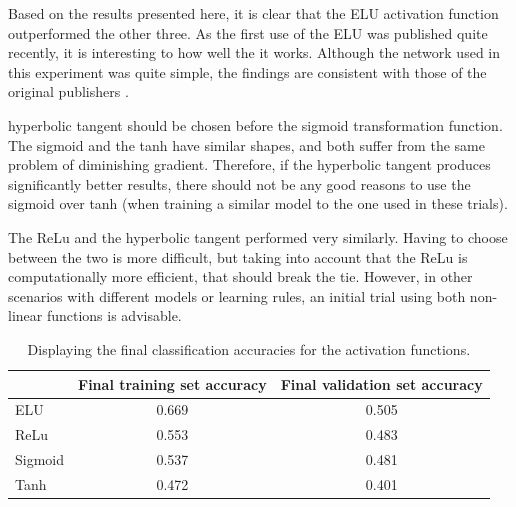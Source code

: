 \documentclass[]{article}
\begin{document}
Based on the results presented here, it is clear that the ELU activation function outperformed the other three. As the first use of the ELU was published quite recently, it is interesting to how well the it works. Although the network used in this experiment was quite simple, the findings are consistent with those of the original publishers \cite{elu}. 

 hyperbolic tangent should be chosen before the sigmoid transformation function. The sigmoid and the tanh have similar shapes, and both suffer from the same problem of diminishing gradient. Therefore, if the hyperbolic tangent produces significantly better results, there should not be any good reasons to use the sigmoid over tanh (when training a similar model to the one used in these trials).

The ReLu and the hyperbolic tangent performed very similarly. Having to choose between the two is more difficult, but taking into account that the ReLu is computationally more efficient, that should break the tie. However, in other scenarios with different models or learning rules, an initial trial using both non-linear functions is advisable.

\begin{table}[]
	\centering
	\caption{Displaying the final classification accuracies for the activation functions.}
	\label{part1-table}
	\begin{tabular}{@{}lcc@{}}
		\toprule
		\multicolumn{1}{c}{} & Final training set accuracy & Final validation set accuracy \\ \midrule
		ELU & 0.669 & 0.505 \\
		ReLu & 0.553 & 0.483 \\
		Sigmoid & 0.537 & 0.481 \\
		Tanh & 0.472 & 0.401 \\ \bottomrule
	\end{tabular}
\end{table}
\end{document}
